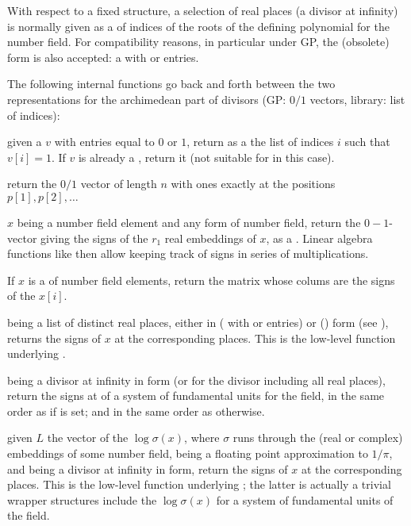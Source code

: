 With respect to a fixed  structure, a selection of real places (a
divisor at infinity) is normally given as a  of indices of the
roots  of the defining polynomial for the number field. For
compatibility reasons, in particular under GP, the (obsolete) 
form is also accepted: a  with  or  entries.

The following internal functions go back and forth between the two
representations for the archimedean part of divisors (GP: $0/1$ vectors,
library: list of indices):

 given a  $v$ with  entries
equal to $0$ or $1$, return as a  the list of indices $i$
such that $v[i] = 1$. If $v$ is already a , return it
(not suitable for  in this case).

 return the $0/1$ vector of length
$n$ with ones exactly at the positions $p[1], p[2], \ldots$


 $x$ being a number field element and 
any form of number field, return the $0-1$-vector giving the signs of the
$r_1$ real embeddings of $x$, as a . Linear algebra functions
like  then allow keeping track of signs in series of
multiplications.

If $x$ is a  of number field elements, return the matrix whose
colums are the signs of the $x[i]$.

  being a list of
distinct real places, either in  ( with  or
 entries) or  () form (see
), returns the signs of $x$ at the corresponding
places. This is the low-level function underlying .

 being a divisor at infinity in  form
(or  for the divisor including all real places), return the signs
at  of a system of fundamental units for the field, in the same
order as  if  is set; and in the same order as
 otherwise.

 given $L$
the vector of the $\log \sigma(x)$, where $\sigma$ runs through the (real
or complex) embeddings of some number field,  being
a floating point approximation to $1/\pi$, and  being a divisor
at infinity in  form, return the signs of $x$
at the corresponding places. This is the low-level function underlying
; the latter is actually a trivial wrapper
 structures include the $\log \sigma(x)$ for a system of fundamental
units of the field.

